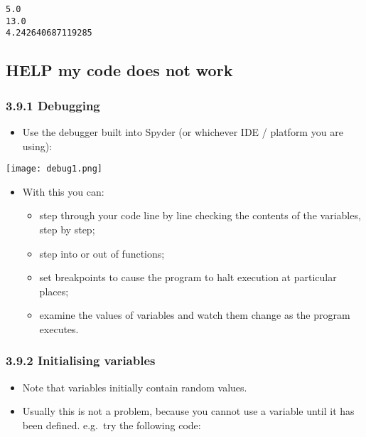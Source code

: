 \documentclass[10pt]{article}
\makeatletter
\def\maxwidth{\ifdim\Gin@nat@width>\linewidth\linewidth
    \else\Gin@nat@width\fi}
\providecommand{\tightlist}{%
      \setlength{\itemsep}{0pt}\setlength{\parskip}{0pt}}
\makeatother
\begin{document}
    \begin{Verbatim}[commandchars=\\\{\}]
5.0
13.0
4.242640687119285

    \end{Verbatim}

    \hypertarget{help-my-code-does-not-work}{%
\subsection{HELP my code does not
work}\label{help-my-code-does-not-work}}

\hypertarget{debugging}{%
\subsubsection*{3.9.1 Debugging}\label{debugging}}

\begin{itemize}
\tightlist
\item
  Use the debugger built into Spyder (or whichever IDE / platform you
  are using):
\end{itemize}

\texttt{[image: debug1.png]}
\begin{itemize}
\item  With this you can: \begin{itemize}
\item  step through your code line by line checking the
contents of the variables, step by step; \item step into or out of
functions; \item set breakpoints to cause the program to halt execution at
particular places; \item examine the values of variables and watch them
change as the program executes.

\end{itemize}

\end{itemize}

\hypertarget{initialising-variables}{%
\subsubsection*{3.9.2 Initialising
variables}\label{initialising-variables}}

\begin{itemize}
\tightlist
\item
  Note that variables initially contain random values.
\item
  Usually this is not a problem, because you cannot use a variable until
  it has been defined. e.g.~try the following code:
\end{itemize}
\end{document}
